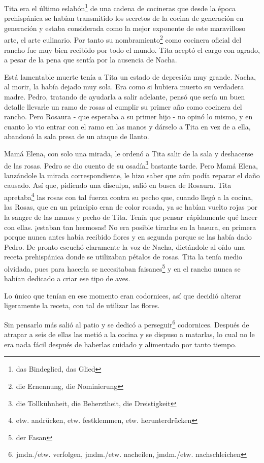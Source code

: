 Tita era el último eslabón\footnote{das Bindeglied, das Glied}
de una cadena de cocineras que desde la época prehispánica se habían
transmitido los secretos de la cocina de generación en generación y estaba
considerada como la mejor exponente de este maravilloso arte, el arte
culinario. Por tanto su nombramiento\footnote{die Ernennung, die Nominierung}
como cocinera oficial del rancho fue muy bien recibido por todo el mundo.
Tita aceptó el cargo con agrado, a pesar de la pena que sentía por la
ausencia de Nacha.

Está lamentable muerte tenía a Tita un estado de depresión muy grande.
Nacha, al morir, la había dejado muy sola. Era como si hubiera muerto su
verdadera madre. Pedro, tratando de ayudarla a salir adelante, pensó que
sería un buen detalle llevarle un ramo de rosas al cumplir su primer año
como cocinera del rancho. Pero Rosaura - que esperaba a su primer hijo -
no opinó lo mismo, y en cuanto lo vio entrar con el ramo en las manos y
dárselo a Tita en vez de a ella, abandonó la sala presa de un ataque de
llanto.

Mamá Elena, con solo una mirada, le ordenó a Tita salir de la sala y
deshacerse de las rosas. Pedro se dio cuento de su osadía\footnote{die Tollkühnheit, die Beherztheit, die Dreistigkeit}
bastante tarde. Pero Mamá Elena, lanzándole la mirada correspondiente,
le hizo saber que aún podía reparar el daño causado. Así que, pidiendo una
disculpa, salió en busca de Rosaura. Tita apretaba\footnote{etw. andrücken, etw. festklemmen, etw. herunterdrücken}
las rosas con tal fuerza contra su pecho que, cuando llegó a la cocina,
las Rosas, que en un principio eran de color rosada, ya se habían vuelto
rojas por la sangre de las manos y pecho de Tita. Tenía que
pensar~rápidamente qué hacer con ellas. ¡estaban tan hermosas!
No era posible tirarlas en la basura, en primera porque nunca antes había
recibido flores y en segunda porque se las había dado Pedro. De pronto
escuchó claramente la voz de Nacha, dictándole al oído una receta
prehispánica donde se utilizaban pétalos de rosas. Tita la tenía medio
olvidada, pues para hacerla se necesitaban faisanes\footnote{der Fasan} y en el rancho nunca se
habían dedicado a criar ese tipo de aves.

Lo único que tenían en ese momento eran codornices, así que decidió
alterar ligeramente la receta, con tal de utilizar las flores.

Sin pensarlo más salió al patio y se dedicó a perseguir\footnote{jmdn./etw. verfolgen, jmdm./etw. nacheilen, jmdm./etw. nachschleichen}
codornices. Después de atrapar a seis de ellas las metió a la cocina
y se dispuso a matarlas, lo cual no le era nada fácil después de
haberlas cuidado y alimentado por tanto tiempo.

